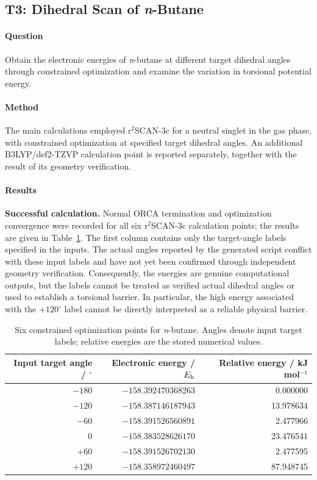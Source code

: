 \subsection{T3: Dihedral Scan of \textit{n}-Butane}
\paragraph{Question}
Obtain the electronic energies of \textit{n}-butane at different target dihedral angles through constrained optimization and examine the variation in torsional potential energy.

\paragraph{Method}
The main calculations employed r$^{2}$SCAN-3c for a neutral singlet in the gas phase, with constrained optimization at specified target dihedral angles.
An additional B3LYP/def2-TZVP calculation point is reported separately, together with the result of its geometry verification.

\paragraph{Results}
\textbf{Successful calculation.} Normal ORCA termination and optimization convergence were recorded for all six r$^{2}$SCAN-3c calculation points;
the results are given in Table~\ref{tab:t3-energies}.
The first column contains only the target-angle labels specified in the inputs.
The actual angles reported by the generated script conflict with these input labels and have not yet been confirmed through independent geometry verification.
Consequently, the energies are genuine computational outputs, but the labels cannot be treated as verified actual dihedral angles or used to establish a torsional barrier.
In particular, the high energy associated with the $+120^\circ$ label cannot be directly interpreted as a reliable physical barrier.

\begin{table}[H]
  \centering\small
  \caption{Six constrained optimization points for \textit{n}-butane.
  Angles denote input target labels; relative energies are the stored numerical values.
  }
  \label{tab:t3-energies}
  \begin{tabular}{rrr}
    \toprule
    Input target angle / $^\circ$ & Electronic energy / $E_{\mathrm h}$ & Relative energy / kJ mol$^{-1}$\\
    \midrule
    $-180$ & $-158.392470368263$ & 0.000000\\
    $-120$ & $-158.387146187943$ & 13.978634\\
    $-60$ & $-158.391526560891$ & 2.477966\\
    $0$ & $-158.383528626170$ & 23.476541\\
    $+60$ & $-158.391526702130$ & 2.477595\\
    $+120$ & $-158.358972460497$ & 87.948745\\
    \bottomrule
  \end{tabular}
\end{table}

